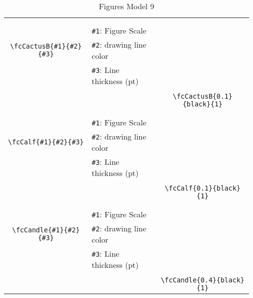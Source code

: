 \documentclass[x11names]{article}
\begin{document}
\begin{table}[H]
\begin{tabular}{|c|l|c|}
	&&\multirow{5}{*}{\fcCactusB{0.1}{black}{1}}\\	&&\\	&\verb|#1|: Figure Scale &\\	\verb|\fcCactusB{#1}{#2}{#3}|&	\verb|#2|: drawing line color &\\	&\verb|#3|: Line thickness (pt) &\\ &&\\&&	\verb|\fcCactusB{0.1}{black}{1}|\\\hline 	
	&&\multirow{5}{*}{\fcCalf{0.1}{black}{1}}\\	&&\\	&\verb|#1|: Figure Scale &\\	\verb|\fcCalf{#1}{#2}{#3}|&	\verb|#2|: drawing line color &\\	&\verb|#3|: Line thickness (pt) &\\ &&\\&&	\verb|\fcCalf{0.1}{black}{1}|\\\hline 	
	&&\multirow{5}{*}{\fcCandle{0.4}{black}{1}}\\	&&\\	&\verb|#1|: Figure Scale &\\	\verb|\fcCandle{#1}{#2}{#3}|&	\verb|#2|: drawing line color &\\	&\verb|#3|: Line thickness (pt) &\\ &&\\&&	\verb|\fcCandle{0.4}{black}{1}|\\\hline 	\hline\end{tabular}\caption{Figures Model 9}\label{tab9}\end{table}
\end{document}
